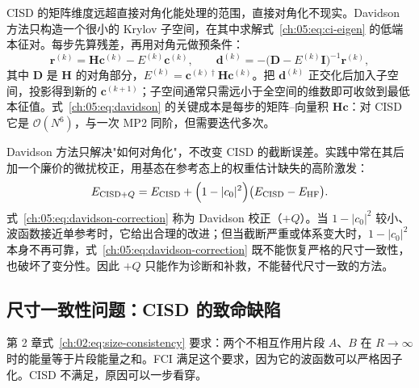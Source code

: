 CISD 的矩阵维度远超直接对角化能处理的范围，直接对角化不现实。Davidson 方法只构造一个很小的 Krylov 子空间，在其中求解式~\eqref{ch:05:eq:ci-eigen} 的低端本征对\citep{helgaker2000}。每步先算残差，再用对角元做预条件：
\begin{equation}
\mathbf{r}^{(k)} = \mathbf{H}\mathbf{c}^{(k)} - E^{(k)}\mathbf{c}^{(k)},
\qquad
\mathbf{d}^{(k)} = -\big(\mathbf{D}-E^{(k)}\mathbf{I}\big)^{-1}\mathbf{r}^{(k)},
\label{ch:05:eq:davidson}
\end{equation}
其中 $\mathbf{D}$ 是 $\mathbf{H}$ 的对角部分，$E^{(k)}=\mathbf{c}^{(k)\dagger}\mathbf{H}\mathbf{c}^{(k)}$。把 $\mathbf{d}^{(k)}$ 正交化后加入子空间，投影得到新的 $\mathbf{c}^{(k+1)}$；子空间通常只需远小于全空间的维数即可收敛到最低本征值。式~\eqref{ch:05:eq:davidson} 的关键成本是每步的矩阵--向量积 $\mathbf{H}\mathbf{c}$：对 CISD 它是 $\mathcal{O}(N^6)$，与一次 MP2 同阶，但需要迭代多次。

Davidson 方法只解决"如何对角化"，不改变 CISD 的截断误差。实践中常在其后加一个廉价的微扰校正，用基态在参考态上的权重估计缺失的高阶激发：
\begin{equation}
E_{\mathrm{CISD}+Q}
= E_{\mathrm{CISD}}
+ \Big(1-|c_0|^2\Big)
  \big(E_{\mathrm{CISD}}-E_{\mathrm{HF}}\big).
\label{ch:05:eq:davidson-correction}
\end{equation}
式~\eqref{ch:05:eq:davidson-correction} 称为 Davidson 校正（$+Q$）。当 $1-|c_0|^2$ 较小、波函数接近单参考时，它给出合理的改进；但当截断严重或体系变大时，$1-|c_0|^2$ 本身不再可靠，式~\eqref{ch:05:eq:davidson-correction} 既不能恢复严格的尺寸一致性，也破坏了变分性。因此 $+Q$ 只能作为诊断和补救，不能替代尺寸一致的方法。

\subsection{尺寸一致性问题：CISD 的致命缺陷}
\label{ch:05:sec:size-consistency}

第 2 章式~\eqref{ch:02:eq:size-consistency} 要求：两个不相互作用片段 $A$、$B$ 在 $R\to\infty$ 时的能量等于片段能量之和。FCI 满足这个要求，因为它的波函数可以严格因子化。CISD 不满足，原因可以一步看穿。

